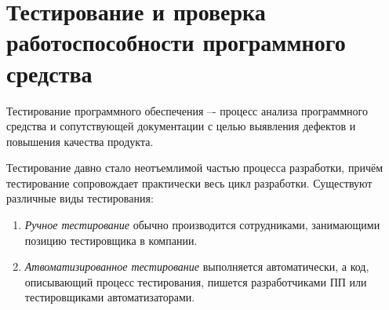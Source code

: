 \section{Тестирование и проверка работоспособности программного средства}
\label{sec:testing}

Тестирование программного обеспечения –- процесс анализа программного средства и сопутствующей документации с целью выявления дефектов и повышения качества продукта\cite{kulikov_testing}.

Тестирование давно стало неотъемлимой частью процесса разработки, причём тестирование сопровождает практически весь цикл разработки. Существуют различные виды тестирования:
\begin{enumerate}
	\item \textit{Ручное тестирование} обычно производится сотрудниками, занимающими позицию тестировщика в компании.
	\item \textit{Атвоматизированное тестирование} выполняется автоматически, а код, описывающий процесс тестирования, пишется разработчиками ПП или тестировщиками автоматизаторами.
\end{enumerate}